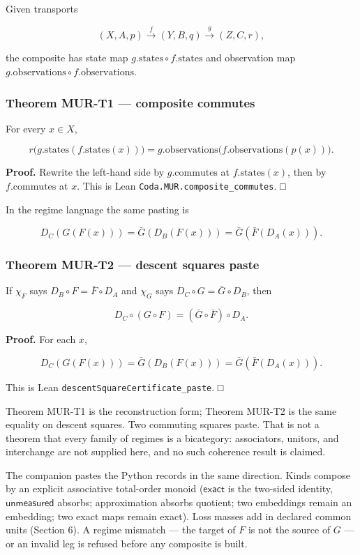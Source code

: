 \documentclass[
  11pt,
]{article}
\begin{document}
Given transports

\[
(X,A,p)\xrightarrow{f}(Y,B,q)\xrightarrow{g}(Z,C,r),
\]

the composite has state map \(g.\mathrm{states}\circ f.\mathrm{states}\) and observation map \(g.\mathrm{observations}\circ f.\mathrm{observations}\).

\subsubsection{Theorem MUR-T1 --- composite commutes}\label{theorem-mur-t1-composite-commutes}

For every \(x\in X\),

\[
r\bigl(g.\mathrm{states}(f.\mathrm{states}(x))\bigr)
=
g.\mathrm{observations}\bigl(f.\mathrm{observations}(p(x))\bigr).
\]

\textbf{Proof.} Rewrite the left-hand side by \(g.\mathrm{commutes}\) at \(f.\mathrm{states}(x)\), then by \(f.\mathrm{commutes}\) at \(x\). This is Lean \nolinkurl{Coda.MUR.composite_commutes}. □

In the regime language the same pasting is

\[
D_C(G(F(x)))=\bar G(D_B(F(x)))=\bar G(\bar F(D_A(x))).
\]

\subsubsection{Theorem MUR-T2 --- descent squares paste}\label{theorem-mur-t2-descent-squares-paste}

If \(\chi_F\) says \(D_B\circ F=\bar F\circ D_A\) and \(\chi_G\) says \(D_C\circ G=\bar G\circ D_B\), then

\[
D_C\circ(G\circ F)=(\bar G\circ\bar F)\circ D_A.
\]

\textbf{Proof.} For each \(x\),

\[
D_C(G(F(x)))=\bar G(D_B(F(x)))=\bar G(\bar F(D_A(x))).
\]

This is Lean \nolinkurl{descentSquareCertificate_paste}. □

Theorem MUR-T1 is the reconstruction form; Theorem MUR-T2 is the same equality on descent squares. Two commuting squares paste. That is not a theorem that every family of regimes is a bicategory: associators, unitors, and interchange are not supplied here, and no such coherence result is claimed.

The companion pastes the Python records in the same direction. Kinds compose by an explicit associative total-order monoid (\(\mathsf{exact}\) is the two-sided identity, \(\mathsf{unmeasured}\) absorbs; approximation absorbs quotient; two embeddings remain an embedding; two exact maps remain exact). Loss masses add in declared common units (Section 6). A regime mismatch --- the target of \(F\) is not the source of \(G\) --- or an invalid leg is refused before any composite is built.
\end{document}
